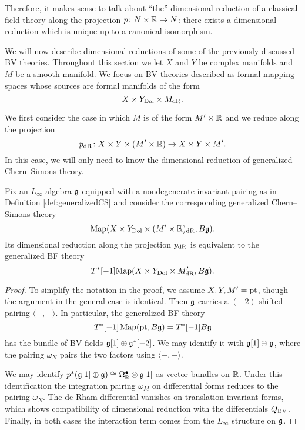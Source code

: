 \documentclass[10pt, oneside]{article}
\begin{document}
\begin{remark}
Therefore, it makes sense to talk about ``the'' dimensional reduction of a classical field theory along the projection $p \colon N \times \mathbb R \to N$: there exists a dimensional reduction which is unique up to a canonical isomorphism.
\end{remark}

We will now describe dimensional reductions of some of the previously discussed BV theories.
Throughout this section we let $X$ and $Y$ be complex manifolds and $M$ be a smooth manifold. 
We focus on BV theories described as formal mapping spaces whose sources are formal manifolds of the form 
\begin{equation}\label{eqn: generalized}
X \times Y_{\rm Dol} \times M_{\rm dR} .
\end{equation}

We first consider the case in which $M$ is of the form $M' \times \mathbb R$ and we reduce along the projection
\[p_{\rm dR} \colon X \times Y \times (M' \times \mathbb R) \to X \times Y \times M' .\]
In this case, we will only need to know the dimensional reduction of generalized Chern--Simons theory.

\begin{prop} \label{CS_to_BF_diml_red_prop}
Fix an $L_\infty$ algebra $\mathfrak g$ equipped with a nondegenerate invariant pairing as in Definition \ref{def:generalizedCS} and consider the corresponding generalized Chern--Simons theory
\[\operatorname{Map}(X\times Y_{\mathrm{Dol}}\times (M'\times \mathbb R)_{\mathrm{dR}}, B\mathfrak g).\]
Its dimensional reduction along the projection $p_{\rm dR}$ is equivalent to the generalized BF theory
\[
T^*[-1] {\rm Map}(X\times Y_{\mathrm{Dol}}\times M'_{\mathrm{dR}}, B\mathfrak g) .
\]
\end{prop}

\begin{proof}
To simplify the notation in the proof, we assume $X,Y,M'=\operatorname{pt}$, though the argument in the general case is identical. Then $\mathfrak g$ carries a $(-2)$-shifted pairing $\langle-,-\rangle$. In particular, the generalized BF theory
\[T^*[-1] \operatorname{Map}(\operatorname{pt}, B \mathfrak g) = T^*[-1] B \mathfrak g\]
has the bundle of BV fields $\mathfrak g[1] \oplus \mathfrak g^*[-2]$. We may identify it with $\mathfrak g[1]\oplus \mathfrak g$, where the pairing $\omega_N$ pairs the two factors using $\langle-,-\rangle$.

We may identify $p^*(\mathfrak g[1]\oplus \mathfrak g)\cong \Omega^\bullet_{\mathbb R}\otimes \mathfrak g[1]$ as vector bundles on $\mathbb R$. 
Under this identification the integration pairing $\omega_M$ on differential forms reduces to the pairing $\omega_N$. The de Rham differential vanishes on translation-invariant forms, which shows compatibility of dimensional reduction with the differentials $Q_{\mathrm{BV}}$. Finally, in both cases the interaction term comes from the $L_\infty$ structure on $\mathfrak g$.
\end{proof}
\end{document}
